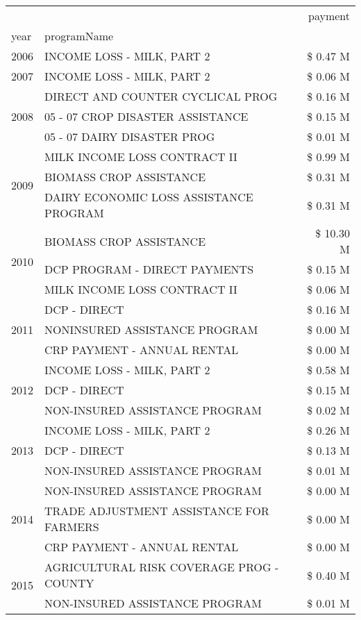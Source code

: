 \begin{tabular}{llr}
\toprule
 &  & payment \\
year & programName &  \\
\midrule
2006 & INCOME LOSS - MILK, PART 2 & \$ 0.47 M \\
\cline{1-3}
2007 & INCOME LOSS - MILK, PART 2 & \$ 0.06 M \\
\cline{1-3}
\multirow[t]{3}{*}{2008} & DIRECT AND COUNTER CYCLICAL PROG & \$ 0.16 M \\
 & 05 - 07 CROP DISASTER ASSISTANCE & \$ 0.15 M \\
 & 05 - 07 DAIRY DISASTER PROG & \$ 0.01 M \\
\cline{1-3}
\multirow[t]{3}{*}{2009} & MILK INCOME LOSS CONTRACT II & \$ 0.99 M \\
 & BIOMASS CROP ASSISTANCE & \$ 0.31 M \\
 & DAIRY ECONOMIC LOSS ASSISTANCE PROGRAM & \$ 0.31 M \\
\cline{1-3}
\multirow[t]{3}{*}{2010} & BIOMASS CROP ASSISTANCE & \$ 10.30 M \\
 & DCP PROGRAM - DIRECT PAYMENTS & \$ 0.15 M \\
 & MILK INCOME LOSS CONTRACT II & \$ 0.06 M \\
\cline{1-3}
\multirow[t]{3}{*}{2011} & DCP - DIRECT & \$ 0.16 M \\
 & NONINSURED ASSISTANCE PROGRAM & \$ 0.00 M \\
 & CRP PAYMENT - ANNUAL RENTAL & \$ 0.00 M \\
\cline{1-3}
\multirow[t]{3}{*}{2012} & INCOME LOSS - MILK, PART 2 & \$ 0.58 M \\
 & DCP - DIRECT & \$ 0.15 M \\
 & NON-INSURED ASSISTANCE PROGRAM & \$ 0.02 M \\
\cline{1-3}
\multirow[t]{3}{*}{2013} & INCOME LOSS - MILK, PART 2 & \$ 0.26 M \\
 & DCP - DIRECT & \$ 0.13 M \\
 & NON-INSURED ASSISTANCE PROGRAM & \$ 0.01 M \\
\cline{1-3}
\multirow[t]{3}{*}{2014} & NON-INSURED ASSISTANCE PROGRAM & \$ 0.00 M \\
 & TRADE ADJUSTMENT ASSISTANCE FOR FARMERS & \$ 0.00 M \\
 & CRP PAYMENT - ANNUAL RENTAL & \$ 0.00 M \\
\cline{1-3}
\multirow[t]{3}{*}{2015} & AGRICULTURAL RISK COVERAGE PROG - COUNTY & \$ 0.40 M \\
 & NON-INSURED ASSISTANCE PROGRAM & \$ 0.01 M \\

\end{tabular}
